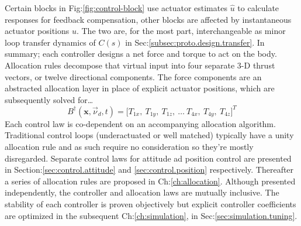 \par
Certain blocks in Fig:\ref{fig:control-block} use actuator estimates $\hat{u}$ to calculate responses for feedback compensation, other blocks are affected by instantaneous actuator positions $u$. The two are, for the most part, interchangeable as minor loop transfer dynamics of $C(s)$ in Sec:\ref{subsec:proto.design.transfer}. In summary; each controller designs a net force and torque to act on the body. Allocation rules decompose that virtual input into four separate 3-D thrust vectors, or twelve directional components. The force components are an abstracted allocation layer in place of explicit actuator positions, which are subsequently solved for\ldots
\begin{equation}
B^{\dagger}(\mathbf{x},\vec{\nu}_d,t)=\big[ T_{1x},~T_{1y},~T_{1z},~\ldots~T_{4x},~T_{4y},~T_{4z}\big]^T
\end{equation}
Each control law is co-dependent on an accompanying allocation algorithm. Traditional control loops (underactuated or well matched) typically have a unity allocation rule and as such require no consideration so they're mostly disregarded. Separate control laws for attitude ad position control are presented in Section:\ref{sec:control.attitude} and \ref{sec:control.position} respectively. Thereafter a series of allocation rules are proposed in Ch:\ref{ch:allocation}. Although presented independently, the controller and allocation laws are mutually inclusive. The stability of each controller is proven objectively but explicit controller coefficients are optimized in the subsequent Ch:\ref{ch:simulation}, in Sec:\ref{sec:simulation.tuning}.
\newpage
